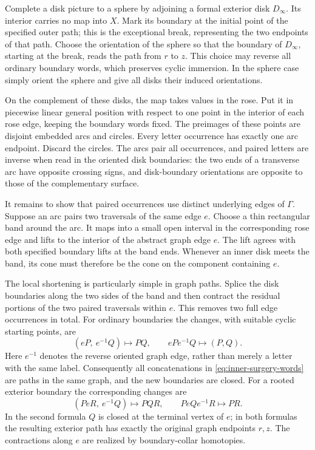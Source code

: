 Complete a disk picture to a sphere by adjoining a formal exterior
disk $D_\infty$.  Its interior carries no map into $X$.  Mark its
boundary at the initial point of the specified outer path; this is
the exceptional break, representing the two endpoints of that path.
Choose the orientation of the sphere so that the boundary of
$D_\infty$, starting at the break, reads the path from $r$ to $z$.
This choice may reverse all ordinary boundary words, which preserves
cyclic immersion.  In the sphere case simply orient the sphere and
give all disks their induced orientations.

On the complement of these disks, the map takes values in the rose.
Put it in piecewise linear general position with respect to one point
in the interior of each rose edge, keeping the boundary words fixed.
The preimages of these points are disjoint embedded arcs and circles.
Every letter occurrence has exactly one arc endpoint.  Discard the
circles.  The arcs pair all occurrences, and paired letters are inverse
when read in the oriented disk boundaries: the two ends of a
transverse arc have opposite crossing signs, and disk-boundary
orientations are opposite to those of the complementary surface.

It remains to show that paired occurrences use distinct underlying
edges of $\Gamma$.  Suppose an arc pairs two traversals of the same
edge $e$.  Choose a thin rectangular band around the arc.  It maps
into a small open interval in the corresponding rose edge and lifts
to the interior of the abstract graph edge $e$.  The lift agrees with
both specified boundary lifts at the band ends.  Whenever an inner
disk meets the band, its cone must therefore be the cone on the
component containing $e$.

The local shortening is particularly simple in graph paths.  Splice
the disk boundaries along the two sides of the band and then contract
the residual portions of the two paired traversals within $e$.
This removes two full edge occurrences in total. For ordinary
boundaries the changes, with suitable cyclic starting points, are
\begin{equation}\label{eq:inner-surgery-words}
 (eP,\ e^{-1}Q)\longmapsto PQ,
 \qquad
 eP e^{-1}Q\longmapsto(P,Q).
\end{equation}
Here $e^{-1}$ denotes the reverse oriented graph edge, rather than
merely a letter with the same label.  Consequently all concatenations
in \eqref{eq:inner-surgery-words} are paths in the same graph, and the
new boundaries are closed.  For a rooted exterior boundary the
corresponding changes are
\begin{equation}\label{eq:exterior-surgery-words}
 (P e R,\ e^{-1}Q)\longmapsto PQR,
 \qquad
 P e Q e^{-1}R\longmapsto PR.
\end{equation}
In the second formula $Q$ is closed at the terminal vertex of $e$;
in both formulas the resulting exterior path has exactly the original
graph endpoints $r,z$.  The contractions along $e$ are realized by
boundary-collar homotopies.

